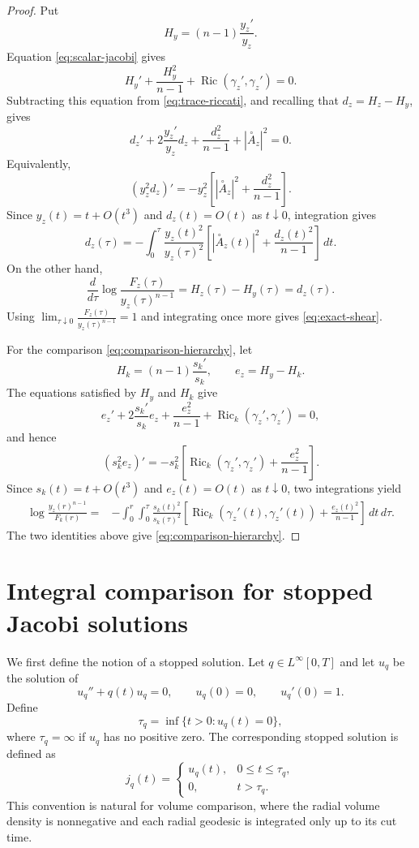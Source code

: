 \documentclass[11pt, reqno]{amsart}
\begin{document}
\begin{proof}
Put
$$H_y=(n-1)\frac{y_z'}{y_z}. $$
Equation \eqref{eq:scalar-jacobi} gives
$$
H_y' +\frac{H_y^2}{n-1} +\operatorname{Ric}(\gamma_z', \gamma_z') =0.
$$
Subtracting this equation from \eqref{eq:trace-riccati}, and recalling that $d_z=H_z-H_y$, gives
$$
d_z' +2\frac{y_z'}{y_z}d_z +\frac{d_z^2}{n-1} +\left|\stackrel{\circ}{A}_z\right|^2
=0.
$$
Equivalently,
$$
\left(y_z^2d_z\right)' = -y_z^2 \left[\left|\stackrel{\circ}{A}_z\right|^2 +\frac{d_z^2}{n-1} \right].
$$
Since $y_z(t)=t+O(t^3)$ and $d_z(t)=O(t)$ as $t\downarrow0$,
integration gives
$$
d_z(\tau)
=-\int_0^\tau \frac{y_z(t)^2}{y_z(\tau)^2} \left[\left|\stackrel{\circ}{A}_z(t)\right|^2 +\frac{d_z(t)^2}{n-1} \right] \, dt.
$$
On the other hand,
$$
\frac{d}{d\tau} \log\frac{F_z(\tau)}{y_z(\tau)^{n-1}}
=H_z(\tau)-H_y(\tau)
=d_z(\tau).
$$
Using $\lim_{\tau\downarrow0} \frac{F_z(\tau)}{y_z(\tau)^{n-1}} =1$
and integrating once more gives \eqref{eq:exact-shear}.

For the comparison \eqref{eq:comparison-hierarchy}, let
$$
H_k=(n-1)\frac{s_k'}{s_k}, \qquad e_z=H_y-H_k.
$$
The equations satisfied by $H_y$ and $H_k$ give
$$
e_z' +2\frac{s_k'}{s_k}e_z +\frac{e_z^2}{n-1} +\operatorname{Ric}_k(\gamma_z', \gamma_z') =0,
$$
and hence
$$
\left(s_k^2e_z\right)' =-s_k^2 \left[\operatorname{Ric}_k(\gamma_z', \gamma_z') +\frac{e_z^2}{n-1} \right].
$$
Since $s_k(t)=t+O(t^3)$ and $e_z(t)=O(t)$ as $t\downarrow0$, two integrations yield
\begin{align*}
\log\frac{y_z(r)^{n-1}}{F_k(r)}
=& -\int_0^r\int_0^\tau \frac{s_k(t)^2}{s_k(\tau)^2} \left[\operatorname{Ric}_k \left(\gamma_z'(t), \gamma_z'(t)\right) +\frac{e_z(t)^2}{n-1} \right] \, dt\, d\tau.
\end{align*}
The two identities above give \eqref{eq:comparison-hierarchy}.
\end{proof}

\section{Integral comparison for stopped Jacobi solutions}\label{sec: integral comp}

We first define the notion of a stopped solution. Let $q\in L^\infty[0, T]$ and let $u_q$ be the solution of
\begin{equation}\label{eq:ordinary-scalar-jacobi}
u_q''+q(t)u_q=0, \qquad u_q(0)=0, \qquad u_q'(0)=1.
\end{equation}
Define
$$\tau_q=\inf\{t>0:u_q(t)=0\}, $$
where $\tau_q=\infty$ if $u_q$ has no positive zero. The corresponding stopped solution is defined as
\begin{equation}\label{eq:definition-stopped-solution}
j_q(t)=
\begin{cases}
u_q(t), & 0\le t\le \tau_q, \\
0, & t>\tau_q.
\end{cases}
\end{equation}
This convention is natural for volume comparison, where the radial volume density is nonnegative and each radial geodesic is integrated only up to its cut time.
\end{document}
